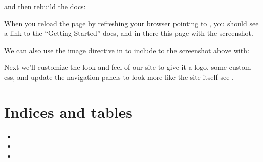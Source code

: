 \documentclass[letterpaper,10pt,english]{sphinxmanual}
\begin{document}
\begin{sphinxVerbatim}[commandchars=\\\{\}]

 
    

\end{sphinxVerbatim}

and then rebuild the docs:

\begin{sphinxVerbatim}[commandchars=\\\{\}]
 
 
\end{sphinxVerbatim}

When you reload the page by refreshing your browser pointing to
, you should see a link to the
“Getting Started” docs, and in there this page with the screenshot.

We can also use the image directive in  to include to the screenshot above
with:

\begin{sphinxVerbatim}[commandchars=\\\{\}]
 
\end{sphinxVerbatim}

Next we’ll customize the look and feel of our site to give it a logo,
some custom css, and update the navigation panels to look more like
the  site itself \textendash{} see
.


\chapter{Indices and tables}
\label{\detokenize{index:indices-and-tables}}\begin{itemize}
\item {} 

\item {} 

\item {} 

\end{itemize}



\renewcommand{\indexname}{Index}
\printindex
\end{document}

